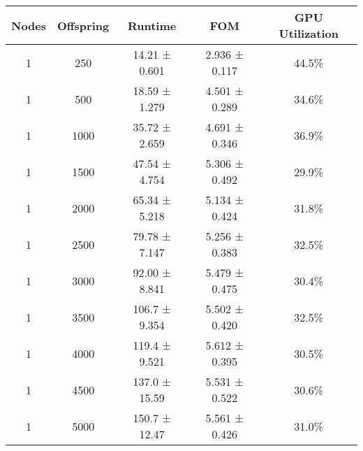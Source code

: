 \begin{tabular}{|c|c|c|c|c|}
\toprule
 Nodes &  Offspring &       Runtime &           FOM & GPU Utilization \\
\midrule
     1 &        250 & 14.21 ± 0.601 & 2.936 ± 0.117 &           44.5\% \\
     1 &        500 & 18.59 ± 1.279 & 4.501 ± 0.289 &           34.6\% \\
     1 &       1000 & 35.72 ± 2.659 & 4.691 ± 0.346 &           36.9\% \\
     1 &       1500 & 47.54 ± 4.754 & 5.306 ± 0.492 &           29.9\% \\
     1 &       2000 & 65.34 ± 5.218 & 5.134 ± 0.424 &           31.8\% \\
     1 &       2500 & 79.78 ± 7.147 & 5.256 ± 0.383 &           32.5\% \\
     1 &       3000 & 92.00 ± 8.841 & 5.479 ± 0.475 &           30.4\% \\
     1 &       3500 & 106.7 ± 9.354 & 5.502 ± 0.420 &           32.5\% \\
     1 &       4000 & 119.4 ± 9.521 & 5.612 ± 0.395 &           30.5\% \\
     1 &       4500 & 137.0 ± 15.59 & 5.531 ± 0.522 &           30.6\% \\
     1 &       5000 & 150.7 ± 12.47 & 5.561 ± 0.426 &           31.0\% \\
\bottomrule
\end{tabular}
